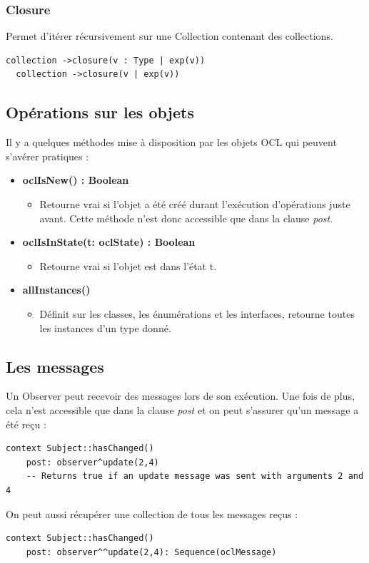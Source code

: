 \documentclass[../Syllabus.tex]{subfiles}
\begin{document}
\subsubsection{Closure}

Permet d'itérer récursivement sur une Collection contenant des collections.

\begin{lstlisting}[language=OCL]
  collection ->closure(v : Type | exp(v))
  collection ->closure(v | exp(v))
\end{lstlisting}

\subsection{Opérations sur les objets}

Il y a quelques méthodes mise à disposition par les objets OCL qui peuvent s'avérer pratiques :

\begin{itemize}
  \item \textbf{oclIsNew() : Boolean}
  \begin{itemize}
    \item Retourne vrai si l'objet a été créé durant l'exécution d'opérations juste avant. Cette méthode n'est donc accessible que dans la clause \textit{post}.
  \end{itemize}
  \item \textbf{oclIsInState(t: oclState) : Boolean}
  \begin{itemize}
    \item Retourne vrai si l'objet est dans l'état t.
  \end{itemize}
  \item \textbf{allInstances()}
  \begin{itemize}
    \item Définit sur les classes, les énumérations et les interfaces, retourne toutes les instances d'un type donné.
  \end{itemize}
\end{itemize}

\subsection{Les messages}

Un Observer peut recevoir des messages lors de son exécution. Une fois de plus, cela n'est accessible que dans la clause \textit{post} et on peut s'assurer qu'un message a été reçu :

\begin{lstlisting}[language=OCL]
  context Subject::hasChanged()
    post: observer^update(2,4)
    -- Returns true if an update message was sent with arguments 2 and 4
\end{lstlisting}

On peut aussi récupérer une collection de tous les messages reçus :

\begin{lstlisting}[language=OCL]
  context Subject::hasChanged()
    post: observer^^update(2,4): Sequence(oclMessage)
\end{lstlisting}
\end{document}
